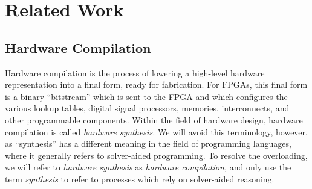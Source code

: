 \section{Related Work}
\label{sec:background-and-related-work}







  
\subsection{Hardware Compilation}
\label{sec:background-hardware-compilation}

Hardware compilation
  is the process of lowering
  a high-level hardware representation
  into a final form, ready for
  fabrication.
For FPGAs,
  this final form
  is a binary ``bitstream''
  which is sent to the FPGA
  and which configures the various
  lookup tables,
  digital signal processors,
  memories,
  interconnects,
  and other programmable components.
Within the field
  of hardware design,
  hardware compilation
  is called
  \textit{hardware synthesis.}
We will avoid
  this terminology,
  however,
  as
  ``synthesis''
  has a different meaning
  in the field of
  programming languages,
  where it
  generally
  refers to
  solver-aided programming.
To resolve the overloading,
  we will refer to 
  \textit{hardware synthesis}
  as \textit{hardware compilation,}
  and only use the term \textit{synthesis}
  to refer to processes
  which rely on solver-aided reasoning.

